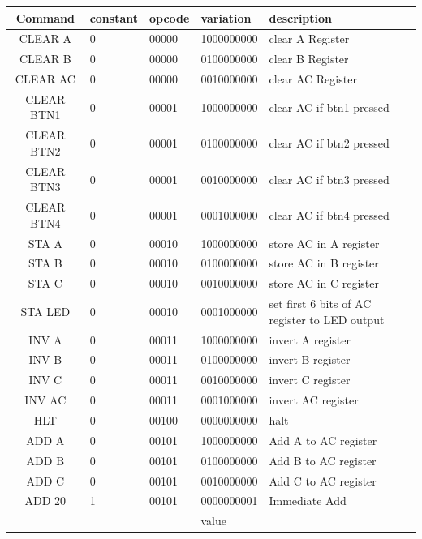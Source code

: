 \documentclass[a4paper,12pt]{article}
\begin{document}
    \begin{table}[h]
    \footnotesize
    \centering
    \setlength{\tabcolsep}{0.5em} %
    {\renewcommand{\arraystretch}{1}%
    \begin{tabular}{|c|l|l|l|p{6cm}|}
    \hline
    \textbf{Command} & constant & opcode & variation & description \\ \hline
    CLEAR A & 0 & 00000 & 1000000000 & clear A Register \\ \hline
    CLEAR B & 0 & 00000 & 0100000000 & clear B Register\\ \hline
    CLEAR AC & 0 & 00000 & 0010000000 & clear AC Register\\ \hline
    CLEAR BTN1 & 0 & 00001 & 1000000000 & clear AC if btn1 pressed\\ \hline
    CLEAR BTN2 & 0 & 00001 & 0100000000 & clear AC if btn2 pressed\\ \hline
    CLEAR BTN3 & 0 & 00001 & 0010000000 & clear AC if btn3 pressed\\ \hline
    CLEAR BTN4 & 0 & 00001 & 0001000000 & clear AC if btn4 pressed\\ \hline
    STA A & 0 & 00010 & 1000000000 & store AC in A register\\ \hline
    STA B & 0 & 00010 & 0100000000 & store AC in B register\\ \hline
    STA C & 0 & 00010 & 0010000000 & store AC in C register\\ \hline
    STA LED & 0 & 00010 & 0001000000 & set first 6 bits of AC register to LED output\\ \hline
    INV A & 0 & 00011 & 1000000000 & invert A register\\ \hline
    INV B & 0 & 00011 & 0100000000 & invert B register\\ \hline
    INV C & 0 & 00011 & 0010000000 & invert C register\\ \hline
    INV AC & 0 & 00011 & 0001000000 & invert AC register\\ \hline
    HLT & 0 & 00100 & 0000000000 & halt\\ \hline
    ADD A & 0 & 00101 & 1000000000 & Add A to AC register\\ \hline
    ADD B & 0 & 00101 & 0100000000 & Add B to AC register\\ \hline
    ADD C & 0 & 00101 & 0010000000 & Add C to AC register\\ \hline
    ADD 20 & 1 & 00101 & 0000000001 & Immediate Add \\ 
    &  &  & value  & \\ \hline

\end{tabular}}
\end{table}
\end{document}
